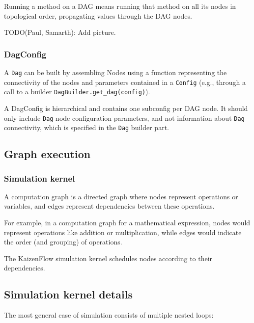 \documentclass[11pt, reqno]{amsart}
\theoremstyle{definition}
\theoremstyle{remark}
\begin{document}
Running a method on a DAG means running that method on all its nodes in
topological order, propagating values through the DAG nodes.

TODO(Paul, Samarth): Add picture.

\subsubsection{DagConfig}
A \verb|Dag| can be built by assembling Nodes using a function representing the
connectivity of the nodes and parameters contained in a \verb|Config| (e.g.,
through a call to a builder \verb|DagBuilder.get_dag(config)|).

A DagConfig is hierarchical and contains one subconfig per DAG node. It should
only include \verb|Dag| node configuration parameters, and not information
about \verb|Dag| connectivity, which is specified in the \verb|Dag| builder
part.


\subsection{Graph execution}

  \subsubsection{Simulation kernel}

  A computation graph is a directed graph where nodes represent operations or
  variables, and edges represent dependencies between these operations.

  For example, in a computation graph for a mathematical expression, nodes would
  represent operations like addition or multiplication, while edges would
  indicate the order (and grouping) of operations.

  The KaizenFlow simulation kernel schedules nodes according to their
  dependencies.

  \subsection{Simulation kernel details}

  The most general case of simulation consists of multiple nested loops:
\end{document}
